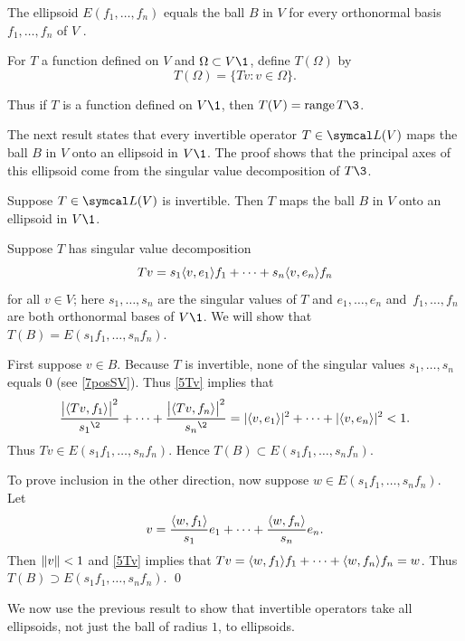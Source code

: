 The ellipsoid $E(f_1, \ldots, f_n)$ equals the ball $B$ in $V$ for every orthonormal basis
$f_1, \ldots, f_n$ of $V$ .

{For $T$ a function defined on $V$ and $\Omega \subset V\1$, define
$T(\Omega)$ by
\[
T(\Omega) = \{ Tv : v \in \Omega \}.
\]}

Thus if $T$ is a function defined on $V\1$, then $T(V) = \ran T\3$.

The next result states that every invertible operator $T \in \L(V)$ maps the ball $B$ in $V$ onto an ellipsoid in $V\1$. The proof shows that the principal axes of this ellipsoid come from the singular value decomposition of $T\3$.

{Suppose $T \in \L(V)$ is invertible. Then
$T$ maps the ball $B$ in $V$ onto an ellipsoid in $V\1$.}

\proof
Suppose $T$ has singular value decomposition
\begin{equation} \label{5Tv}
Tv = s_1 \langle v, e_1\rangle f_1 + \cdots + s_n \langle v, e_n\rangle f_n
\end{equation}
for all $v \in V$; here $s_1, \ldots, s_n$ are the singular values of $T$ and $e_1, \ldots, e_n$ and~$f_1, \ldots, f_n$ are both orthonormal bases of $V\1$. We will show that $T(B) = E(s_1 f_1, \ldots, s_n f_n)$.

First suppose $v \in B$. Because $T$ is invertible, none of the singular values $s_1, \ldots, s_n$ equals $0$ (see \ref{7posSV}). Thus \ref{5Tv} implies that
\vspace{-.03in}
\[
\frac{\abs[\big]{\ip{Tv,f_1}}^2}{{s_1}^{\2}} + \cdots + \frac{\abs[\big]{\ip{Tv,f_n}}^2}{{s_n}^{\2}}
= \abs{\ip{v, e_1}}^2 + \cdots + \abs{\ip{v, e_n}}^2 < 1.
\]
Thus $Tv \in E(s_1 f_1, \ldots, s_n f_n)$. Hence $T(B) \subset E(s_1 f_1, \ldots, s_n f_n)$.

To prove inclusion in the other direction, now suppose $w \in E(s_1 f_1, \ldots, s_n f_n)$. Let
\vspace{-.05in}
\[
v = \frac{\ip{w, f_1}}{s_1} e_1 + \cdots + \frac{\ip{w, f_n}}{s_n} e_n.
\]
Then $\lVert v\rVert < 1$ and \ref{5Tv} implies that $Tv = \langle w,f_1\rangle f_1 + \cdots + \langle w, f_n\rangle f_n = w$. Thus
$T(B) \supset E(s_1 f_1, \ldots, s_n f_n)$.
\qed

\pagebreak[3]

We now use the previous result to show that invertible operators take all ellipsoids, not just the ball of radius $1$, to ellipsoids.

